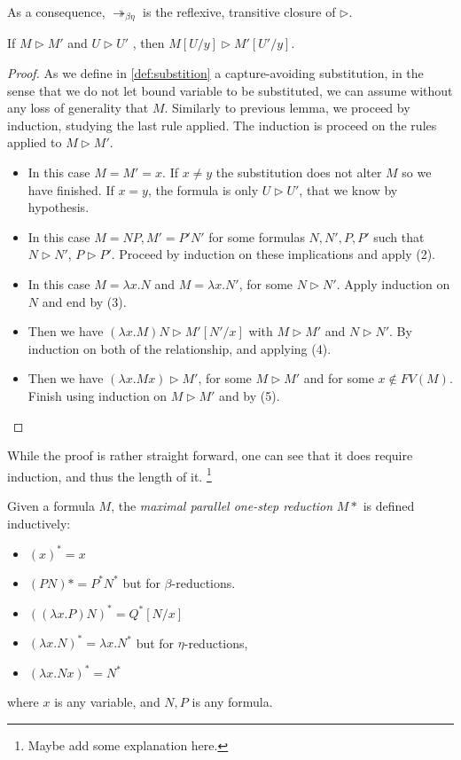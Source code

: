 \begin{remark} As a consequence, $\twoheadrightarrow_{\beta\eta}$ is the reflexive, transitive closure of $\triangleright$.
  \end{remark}
\begin{lemma}If $M \triangleright M'$ and $U \triangleright U'$ , then $M [U/y] \triangleright M' [U' /y]$.
\end{lemma}
\begin{proof}
As we define in \ref{def:substition} a capture-avoiding substitution, in the sense that we do not let bound variable to be substituted, we can assume without any loss of generality that $M$. Similarly to previous lemma, we proceed by induction, studying the last rule applied. The induction is proceed on the rules applied to $M\triangleright M'$.

\begin{itemize}
    \item[(1)] In this case $M=M'=x$. If $x\ne y$ the substitution does not alter $M$ so we have finished. If $x = y$, the formula is only $U\triangleright U'$, that we know by hypothesis.
    \item[(2)] In this case $M=NP, M'=P'N'$ for some formulas $N,N',P,P'$ such that $N\triangleright N'$, $P\triangleright P'$. Proceed by induction on these implications and apply (2).
    \item[(3)] In this case $M=\lambda x.N$ and $M=\lambda x.N'$, for some $N\triangleright N'$. Apply induction on $N$ and end by (3).
    \item[(4)] Then we have $(\lambda x.M)N \triangleright M'[N'/x]$ with $M \triangleright M'$ and $N \triangleright N'$. By induction on both of the relationship, and applying (4).
    \item[(5)] Then we have $(\lambda x.Mx) \triangleright M'$, for some $M\triangleright M'$ and for some $x \not  \in FV(M)$. Finish using induction on $M\triangleright M'$ and by (5).
    \end{itemize}
\end{proof}

While the proof is rather straight forward, one can see that it does require induction, and thus the length of it. \footnote{Maybe add some explanation here.}

\begin{definition}
  Given a formula $M$, the \emph{maximal parallel one-step reduction} $M*$ is defined inductively:
  \begin{itemize}
  \item $(x)^*  =x$ 
  \item $(PN)*=P^*N^*$ but for $\beta$-reductions.
  \item $((\lambda x.P)N)^* = Q^*[N/x] $
  \item $(\lambda x.N)^*=\lambda x.N^*$ but for $\eta$-reductions, 
  \item $(\lambda x.Nx)^*=N^*$ 
  \end{itemize}
  where $x$ is any variable, and $N,P$ is any formula.
\end{definition}



